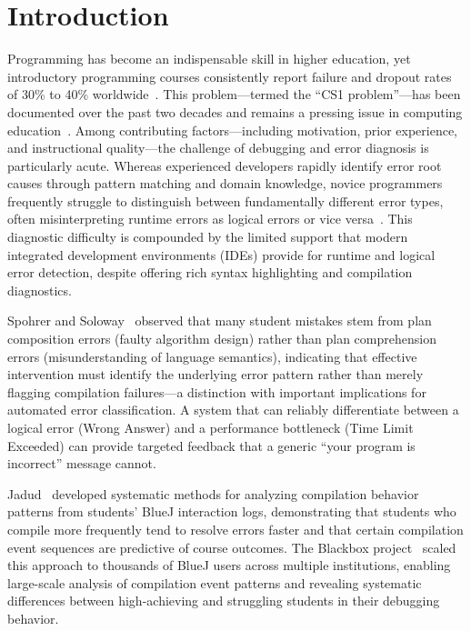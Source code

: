 \documentclass[acmsmall]{acmart}
\begin{document}
\section{Introduction}

Programming has become an indispensable skill in higher education, yet
introductory programming courses consistently report failure and dropout rates
of 30\% to 40\% worldwide~\cite{bennedsen2007failure,watson2018failure}. This
problem---termed the ``CS1 problem''---has been
documented over the past two decades and remains a pressing
issue in computing education~\cite{pears2007survey}. Among contributing
factors---including motivation, prior experience,
and instructional quality---the challenge of debugging and error diagnosis is
particularly acute. Whereas experienced developers rapidly identify
error root causes through pattern matching and domain knowledge, novice
programmers frequently struggle to distinguish between fundamentally different
error types, often misinterpreting runtime errors as logical errors or vice
versa~\cite{mccauley2008evidence}. This diagnostic difficulty is compounded by
the limited support that modern integrated development environments (IDEs)
provide for runtime and logical error detection, despite offering rich
syntax highlighting and compilation diagnostics.

Spohrer and Soloway~\cite{spohrer1986novice} observed that many student
mistakes stem from plan composition errors (faulty algorithm design) rather
than plan comprehension errors (misunderstanding of language semantics),
indicating that effective intervention must identify the underlying
error pattern rather than merely flagging compilation failures---a distinction
with important implications for automated error classification.
A system that can reliably differentiate between a logical error (Wrong
Answer) and a performance bottleneck (Time Limit Exceeded) can provide
targeted feedback that a generic ``your program is incorrect'' message cannot.

Jadud~\cite{jadud2006methods} developed systematic methods
for analyzing compilation behavior patterns from students' BlueJ interaction
logs, demonstrating that students who compile more frequently tend to resolve
errors faster and that certain compilation event sequences are predictive of
course outcomes. The Blackbox project~\cite{brown2014blackbox} scaled this
approach to thousands of BlueJ users across multiple institutions, enabling
large-scale analysis of compilation event patterns and revealing systematic
differences between high-achieving and struggling students in their debugging
behavior.
\end{document}
